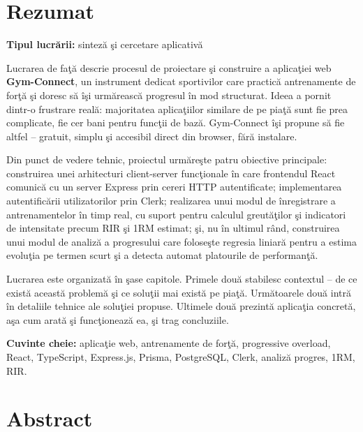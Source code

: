 \chapter*{Rezumat}

\textbf{Tipul lucr\u arii:} sintez\u a \c si cercetare aplicativ\u a

\vspace{1em}

Lucrarea de fa\c t\u a descrie procesul de proiectare \c si construire a
aplica\c tiei web \textbf{Gym-Connect}, un instrument dedicat sportivilor
care practic\u a antrenamente de for\c t\u a \c si doresc s\u a \^ i\c si
urm\u areasc\u a progresul \^ in mod structurat. Ideea a pornit dintr-o
frustrare real\u a: majoritatea aplica\c tiilor similare de pe pia\c t\u a
sunt fie prea complicate, fie cer bani pentru func\c tii de baz\u a.
Gym-Connect \^ i\c si propune s\u a fie altfel -- gratuit, simplu \c si
accesibil direct din browser, f\u ar\u a instalare.

Din punct de vedere tehnic, proiectul urm\u are\c ste patru obiective
principale: construirea unei arhitecturi client-server func\c tionale
\^ in care frontendul React comunic\u a cu un server Express prin cereri
HTTP autentificate; implementarea autentific\u arii utilizatorilor prin
Clerk; realizarea unui modul de \^ inregistrare a antrenamentelor \^ in timp
real, cu suport pentru calculul greut\u a\c tilor \c si indicatori de
intensitate precum RIR \c si 1RM estimat; \c si, nu \^ in ultimul r\^ and,
construirea unui modul de analiz\u a a progresului care folose\c ste
regresia liniar\u a pentru a estima evolu\c tia pe termen scurt \c si a
detecta automat platourile de performan\c t\u a.

Lucrarea este organizat\u a \^ in \c sase capitole. Primele dou\u a
stabilesc contextul -- de ce exist\u a aceast\u a problem\u a \c si ce
solu\c tii mai exist\u a pe pia\c t\u a. Urm\u atoarele dou\u a intr\u a
\^ in detaliile tehnice ale solu\c tiei propuse. Ultimele dou\u a prezint\u a
aplica\c tia concret\u a, a\c sa cum arat\u a \c si func\c tioneaz\u a
ea, \c si trag concluziile.

\vspace{1em}
\noindent\textbf{Cuvinte cheie:} aplica\c tie web, antrenamente de
for\c t\u a, progressive overload, React, TypeScript, Express.js,
Prisma, PostgreSQL, Clerk, analiz\u a progres, 1RM, RIR.

\chapter*{Abstract}

